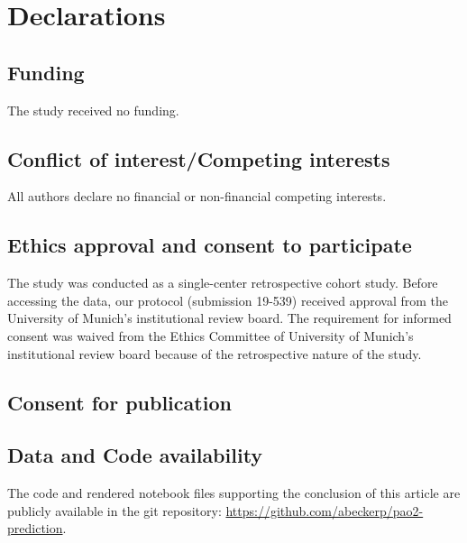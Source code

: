 \documentclass[referee,lineno,pdflatex,sn-nature]{sn-jnl}%
\theoremstyle{thmstyleone}%
\theoremstyle{thmstyletwo}%
\theoremstyle{thmstylethree}%
\begin{document}

\section*{Declarations}

\subsection*{Funding}\label{funding}
The study received no funding.

\subsection*{Conflict of interest/Competing interests}
All authors declare no financial or non-financial competing interests.

\subsection*{Ethics approval and consent to participate}
The study was conducted as a single-center retrospective cohort study.  Before accessing the data, our protocol (submission 19-539) received approval from the University of Munich’s institutional review board. The requirement for informed consent was waived from the Ethics Committee of University of Munich’s institutional review board because of the retrospective nature of the study.

\subsection*{Consent for publication}

\subsection*{Data and Code availability}
The code and rendered notebook files supporting the conclusion of this article are publicly available in the git repository: \href{https://github.com/abeckerp/pao2-prediction}{https://github.com/abeckerp/pao2-prediction}.
\end{document}
